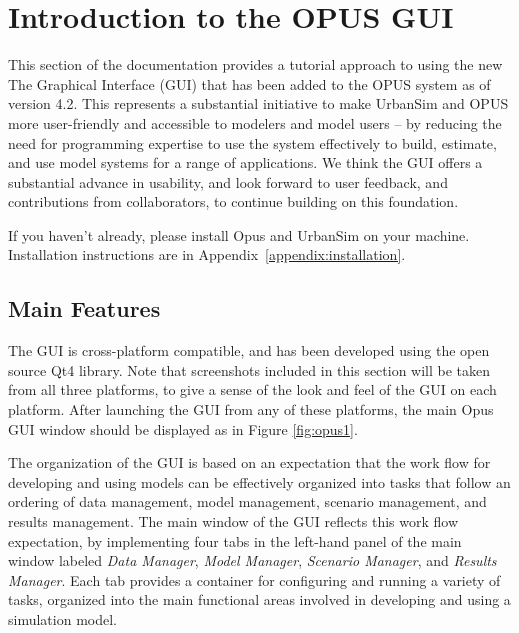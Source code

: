 \chapter{Introduction to the OPUS GUI}

This section of the documentation provides a tutorial approach to using the new The Graphical Interface (GUI) that has been added to the OPUS system as of version 4.2.  This represents a substantial initiative to make UrbanSim and OPUS more user-friendly and accessible to modelers and model users -- by reducing the need for programming expertise to use the system effectively to build, estimate, and use model systems for a range of applications.  We think the GUI offers a substantial advance in usability, and look forward to user feedback, and contributions from collaborators, to continue building on this foundation.

If you haven't already, please install Opus and UrbanSim on your machine.
Installation instructions are in Appendix~\ref{appendix:installation}.

\section{Main Features}

The GUI is cross-platform compatible, and has been developed using the open source Qt4 library.  Note that screenshots included in this section will be taken from all three platforms, to give a sense of the look and feel of the GUI on each platform.  After launching the GUI from any of these platforms, the main Opus GUI window should be displayed as in Figure \ref{fig:opus1}. 

The organization of the GUI is based on an expectation that the work flow for developing and using models can be effectively organized into tasks that follow an ordering of data management, model management, scenario management, and results management.  The main window of the GUI reflects this work flow expectation, by implementing four tabs in the left-hand panel of the main window labeled \emph{Data Manager}, \emph{Model Manager}, \emph{Scenario Manager}, and \emph{Results Manager}.  Each tab provides a container for configuring and running a variety of tasks, organized into the main functional areas involved in developing and using a simulation model.  

